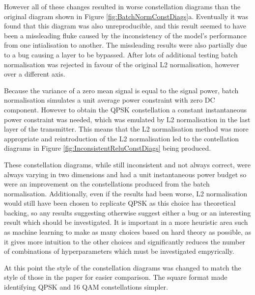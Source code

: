 \documentclass[12pt,onecolumn,letterpaper]{article}
\begin{document}
However all of these changes resulted in worse constellation diagrams than the original diagram shown in Figure \ref{fig:BatchNormConstDiags}a. Eventually it was found that this diagram was also unreproducible, and this result seemed to have been a missleading fluke caused by the inconsistency of the model's performance from one intialisation to another. The missleading results were also partially due to a bug causing a layer to be bypassed. After lots of additional testing batch normalisation was rejected in favour of the original L2 normalisation, however over a different axis. 

Because the variance of a zero mean signal is equal to the signal power, batch normalisation simulates a unit average power constraint with zero DC component. However to obtain the QPSK constellation a constant instantaneous power constraint was needed, which was emulated by L2 normalisation in the last layer of the transmitter. This means that the L2 normalisation method was more appropriate and reintroduction of the L2 normalisation led to the contellation diagrams in Figure \ref{fig:InconsistentReluConstDiags} being produced. 

These constellation diagrams, while still inconsistent and not always correct, were always varying in two dimensions and had a unit instantaneous power budget so were an improvement on the constellations produced from the batch normalisation. Additionally, even if the results had been worse, L2 normalisation would still have been chosen to replicate QPSK as this choice has theoretical backing, so any results suggesting otherwise suggest either a bug or an interesting result which should be investigated. It is important in a more heuristic area such as machine learning to make as many choices based on hard theory as possible, as it gives more intuition to the other choices and significantly reduces the number of combinations of hyperparameters which must be investigated empyrically.

At this point the style of the constellation diagrams was changed to match the style of those in the paper for easier comparison. The square format made identifying QPSK and 16 QAM constellations simpler.
   
\end{document}
